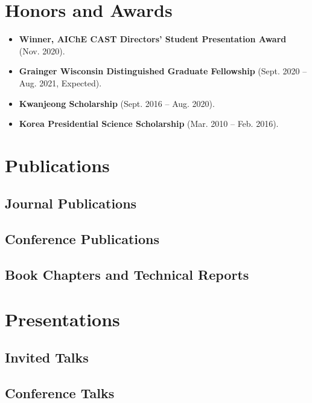 \documentclass{article}
\begin{document}
\section*{Honors and Awards}
\begin{itemize}[leftmargin=*]
\item[] {\bf Winner, AIChE CAST Directors' Student Presentation Award} (Nov. 2020).
\item[] {\bf Grainger Wisconsin Distinguished Graduate Fellowship} (Sept. 2020 -- Aug. 2021, Expected).
\item[] {\bf Kwanjeong Scholarship} (Sept. 2016 -- Aug. 2020).
\item[] {\bf Korea Presidential Science Scholarship} (Mar. 2010 -- Feb. 2016).
\end{itemize}


\section*{Publications}
\subsection*{Journal Publications}
\renewcommand*{\labelenumi}{[J\theenumi]}
\subsection*{Conference Publications}
\renewcommand*{\labelenumi}{[C\theenumi]}
\subsection*{Book Chapters and Technical Reports}
\renewcommand*{\labelenumi}{[B\theenumi]}

\section*{Presentations}
\subsection*{Invited Talks}
\renewcommand*{\labelenumi}{[I\theenumi]}
\subsection*{Conference Talks}
\renewcommand*{\labelenumi}{[P\theenumi]}
\end{document}
